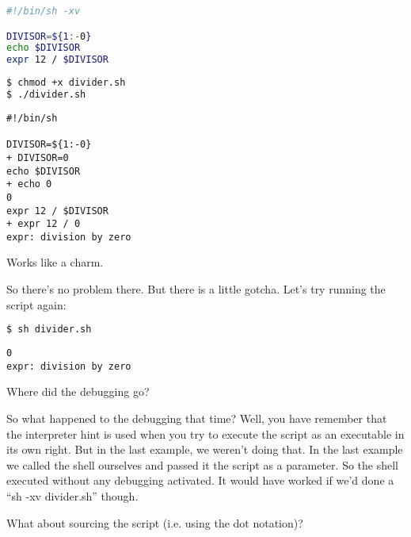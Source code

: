 \lstset{basicstyle=\scriptsize, numbers=left, captionpos=b, tabsize=4}
\begin{lstlisting}[caption=The same script but now with parameters to the interpreter hint,language={bash},
breaklines=true,xleftmargin=15pt,label=lst:The same script but now with parameters to the interpreter hint]
#!/bin/sh -xv

DIVISOR=${1:-0}
echo $DIVISOR
expr 12 / $DIVISOR
\end{lstlisting}

\lstset{basicstyle=\scriptsize, numbers=left, captionpos=b, tabsize=4}
\begin{lstlisting}[caption=Running the script,language={bash},
breaklines=true,xleftmargin=15pt,label=lst:Running the script]
$ chmod +x divider.sh
$ ./divider.sh
\end{lstlisting}

\scriptsize
\begin{verbatim}
#!/bin/sh

DIVISOR=${1:-0}
+ DIVISOR=0
echo $DIVISOR
+ echo 0
0
expr 12 / $DIVISOR
+ expr 12 / 0
expr: division by zero
\end{verbatim}
\normalsize

Works like a charm.

So there's no problem there. But there is a little gotcha. Let's try running
the script again:

\lstset{basicstyle=\scriptsize, numbers=left, captionpos=b, tabsize=4}
\begin{lstlisting}[caption=Running the script again,language={bash},
breaklines=true,xleftmargin=15pt,label=lst:Running the script again]
$ sh divider.sh
\end{lstlisting}

\scriptsize
\begin{verbatim}
0
expr: division by zero
\end{verbatim}
\normalsize
Where did the debugging go?

So what happened to the debugging that time? Well, you have remember that the
interpreter hint is used when you try to execute the script as an executable in
its own right. But in the last example, we weren't doing that. In the last
example we called the shell ourselves and passed it the script as a parameter.
So the shell executed without any debugging activated. It would have worked if
we'd done a ``sh -xv divider.sh'' though.

What about sourcing the script (i.e. using the dot notation)?

